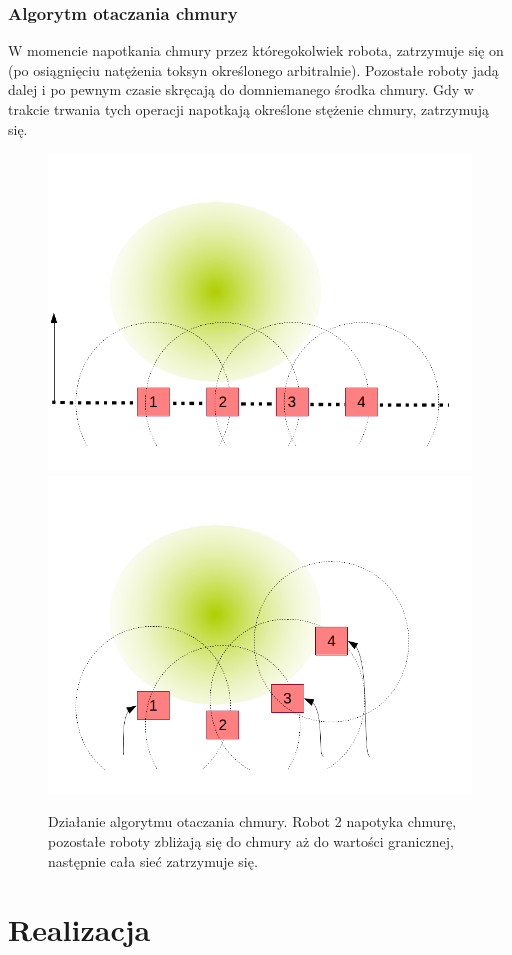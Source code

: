 \documentclass[a4paper, 12pt]{article}
\begin{document}
		\subsubsection{Algorytm otaczania chmury}
		W momencie napotkania chmury przez któregokolwiek robota, zatrzymuje się on (po osiągnięciu natężenia toksyn określonego arbitralnie). Pozostałe roboty jadą dalej i po pewnym czasie skręcają do domniemanego środka chmury. Gdy w trakcie trwania tych operacji napotkają określone stężenie chmury, zatrzymują się.
		\begin{figure}[h!]
			\includegraphics*[width=0.5\columnwidth]{img/chmura/1.png}
			\includegraphics*[width=0.5\columnwidth]{img/chmura/2.png}
			\caption{Działanie algorytmu otaczania chmury. Robot 2 napotyka chmurę, pozostałe roboty zbliżają się do chmury aż do wartości granicznej, następnie cała sieć zatrzymuje się.}
			\label{otaczanie}
		\end{figure}
		
		
		
	
	
	
	\section{Realizacja}
\end{document}
